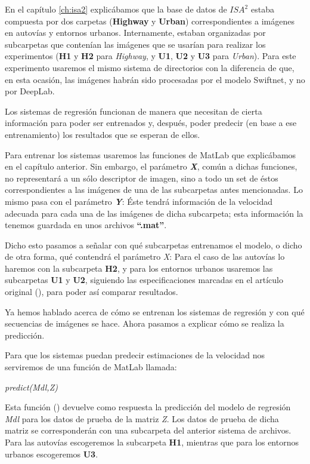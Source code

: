 En el capítulo \ref{ch:isa2} explicábamos que la base de datos de $ISA^{2}$ estaba compuesta por dos carpetas (\textbf{Highway} y \textbf{Urban}) correspondientes a imágenes en autovías y entornos urbanos. Internamente, estaban organizadas por subcarpetas que contenían las imágenes que se usarían para realizar los experimentos (\textbf{H1} y \textbf{H2} para \textit{Highway}, y \textbf{U1}, \textbf{U2} y \textbf{U3} para \textit{Urban}). Para este experimento usaremos el mismo sistema de directorios con la diferencia de que, en esta ocasión, las imágenes habrán sido procesadas por el modelo Swiftnet, y no por DeepLab.

Los sistemas de regresión funcionan de manera que necesitan de cierta información para poder ser entrenados y, después, poder predecir (en base a ese entrenamiento) los resultados que se esperan de ellos.

Para entrenar los sistemas usaremos las funciones de MatLab que explicábamos en el capítulo anterior. Sin embargo, el parámetro \textbf{\textit{X}}, común a dichas funciones, no representará a un sólo descriptor de imagen, sino a todo un set de éstos correspondientes a las imágenes de una de las subcarpetas antes mencionadas. Lo mismo pasa con el parámetro \textbf{\textit{Y}}: Éste tendrá información de la velocidad adecuada para cada una de las imágenes de dicha subcarpeta; esta información la tenemos guardada en unos archivos \textbf{``.mat''}.

Dicho esto pasamos a señalar con qué subcarpetas entrenamos el modelo, o dicho de otra forma, qué contendrá el parámetro \textit{X}: Para el caso de las autovías lo haremos con la subcarpeta \textbf{H2}, y para los entornos urbanos usaremos las subcarpetas \textbf{U1} y \textbf{U2}, siguiendo las especificaciones marcadas en el artículo original (\cite{isa2}), para poder así comparar resultados.

Ya hemos hablado acerca de cómo se entrenan los sistemas de regresión y con qué secuencias de imágenes se hace. Ahora pasamos a explicar cómo se realiza la predicción.

Para que los sistemas puedan predecir estimaciones de la velocidad nos serviremos de una función de MatLab llamada:

\begin{center}
\textit{predict(Mdl,Z)}
\end{center}

Esta función (\cite{predict}) devuelve como respuesta la predicción del modelo de regresión \textit{Mdl} para los datos de prueba de la matriz \textit{Z}. Los datos de prueba de dicha matriz se corresponderán con una subcarpeta del anterior sistema de archivos. Para las autovías escogeremos la subcarpeta \textbf{H1}, mientras que para los entornos urbanos escogeremos \textbf{U3}.

